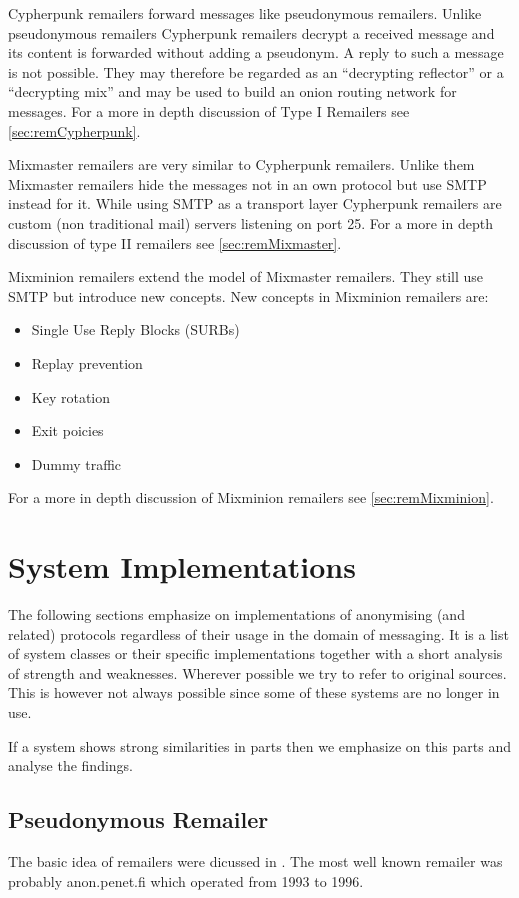 Cypherpunk remailers forward messages like pseudonymous remailers. Unlike pseudonymous remailers Cypherpunk remailers decrypt a received message and its content is forwarded without adding a pseudonym. A reply to such a message is not possible. They may therefore be regarded as an ``decrypting reflector'' or a ``decrypting mix'' and may be used to build an onion routing network for messages. For a more in depth discussion of Type I Remailers see \ref{sec:remCypherpunk}.

Mixmaster remailers are very similar to Cypherpunk remailers. Unlike them Mixmaster remailers hide the messages not in an own protocol but use SMTP instead for it. While using SMTP as a transport layer Cypherpunk remailers are custom (non traditional mail) servers listening on port 25. For a more in depth discussion of type II remailers see \ref{sec:remMixmaster}.

Mixminion remailers extend the model of Mixmaster remailers. They still use SMTP but introduce new concepts. New concepts in Mixminion remailers are:
\begin{itemize}
	\item Single Use Reply Blocks (SURBs)
	\item Replay prevention
	\item Key rotation
	\item Exit poicies
	\item Dummy traffic
\end{itemize}
For a more in depth discussion of Mixminion remailers see \ref{sec:remMixminion}.


\section{System Implementations\label{sec:sysImpl}}
The following sections emphasize on implementations of anonymising (and related) protocols regardless of their usage in the domain of messaging. It is a list of system classes or their specific implementations together with a short analysis of strength and weaknesses. Wherever possible we try to refer to original sources. This is however not always possible since some of these systems are no longer in use.

If a system shows strong similarities in parts then we emphasize on this parts and analyse the findings.

\subsection{Pseudonymous Remailer\label{sec:remPseudo}}
The basic idea of remailers were dicussed in \cite{CHAUM1}. The most well known remailer was probably anon.penet.fi which operated from 1993 to 1996. 

